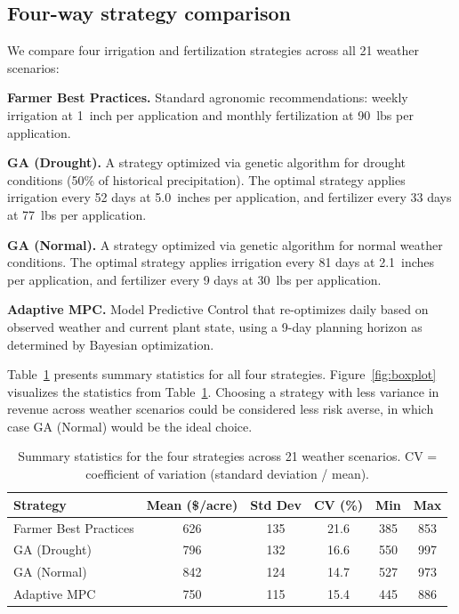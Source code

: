 \documentclass[pdflatex,sn-mathphys-num]{sn-jnl}
\begin{document}
\subsection{Four-way strategy comparison}\label{subsec:comparison}

We compare four irrigation and fertilization strategies across all 21 weather scenarios:

\textbf{Farmer Best Practices.} Standard agronomic recommendations: weekly irrigation at 1~inch per application and monthly fertilization at 90~lbs per application.

\textbf{GA (Drought).} A strategy optimized via genetic algorithm for drought conditions (50\% of historical precipitation). The optimal strategy applies irrigation every 52 days at 5.0~inches per application, and fertilizer every 33 days at 77~lbs per application.

\textbf{GA (Normal).} A strategy optimized via genetic algorithm for normal weather conditions. The optimal strategy applies irrigation every 81 days at 2.1~inches per application, and fertilizer every 9 days at 30~lbs per application.

\textbf{Adaptive MPC.} Model Predictive Control that re-optimizes daily based on observed weather and current plant state, using a 9-day planning horizon as determined by Bayesian optimization.

Table~\ref{tab:main-results} presents summary statistics for all four strategies. Figure~\ref{fig:boxplot} visualizes the statistics from Table~\ref{tab:main-results}. Choosing a strategy with less variance in revenue across weather scenarios could be considered less risk averse, in which case GA (Normal) would be the ideal choice.

\begin{table}[ht]
\centering
\begin{tabular}{|l|c|c|c|c|c|}
\hline
Strategy & Mean (\$/acre) & Std Dev & CV (\%) & Min & Max \\
\hline\hline
Farmer Best Practices & 626 & 135 & 21.6 & 385 & 853 \\
GA (Drought)          & 796 & 132 & 16.6 & 550 & 997 \\
GA (Normal)           & 842 & 124 & 14.7 & 527 & 973 \\
Adaptive MPC          & 750 & 115 & 15.4 & 445 & 886 \\
\hline
\end{tabular}
\caption{Summary statistics for the four strategies across 21 weather scenarios. CV = coefficient of variation (standard deviation / mean).}
\label{tab:main-results}
\end{table}
\end{document}

